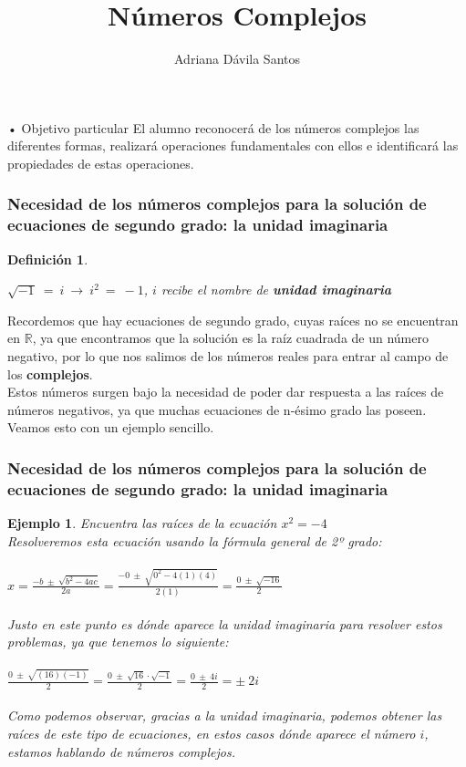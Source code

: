 \documentclass[11pt]{beamer}
\author{Adriana Dávila Santos}
\title{Números Complejos}
\newtheorem{defi}{Definición}
\newtheorem{ejem}{Ejemplo}
\begin{document}
\begin{frame}
\titlepage
\end{frame}


\begin{frame}{• Objetivo particular}
El alumno reconocerá de los números complejos las diferentes formas, realizará operaciones
fundamentales con ellos e identificará las propiedades de estas operaciones.
\end{frame}

\begin{frame}
\frametitle{Necesidad de los números complejos para la solución de ecuaciones de segundo grado: la
 unidad imaginaria}
\begin{defi}
\begin{center}
$\sqrt{-1}~=~i~\rightarrow~i^2~=~-1$, $i$ recibe el nombre de \textbf{unidad imaginaria}
\end{center}
\end{defi} 
Recordemos que hay ecuaciones de segundo grado, cuyas raíces no se encuentran en $\mathbb{R}$, ya que encontramos que la solución es la raíz cuadrada de un número negativo, por lo que nos salimos de los números reales para entrar al campo de los \textbf{complejos}.\\
Estos números surgen bajo la necesidad de poder dar respuesta a las raíces de números negativos, ya que muchas ecuaciones de n-ésimo grado las poseen.\\
Veamos esto con un ejemplo sencillo.
\end{frame}

\begin{frame}
\frametitle{Necesidad de los números complejos para la solución de ecuaciones de segundo grado: la
 unidad imaginaria}
\begin{ejem}
Encuentra las raíces de la ecuación $x^2=-4$\\
Resolveremos esta ecuación usando la fórmula general de 2º grado:\\ \hspace{0cm} \\
$x= \frac{-b~\pm ~\sqrt{b^2-4ac}}{2a} = \frac{-0~\pm ~\sqrt{0^2-4(1)(4)}}{2(1)} = \frac{0~\pm ~\sqrt{-16}}{2}$\\ \hspace{0cm} \\
Justo en este punto es dónde aparece la unidad imaginaria para resolver estos problemas, ya que tenemos lo siguiente:\\ \hspace{0cm} \\
$\frac{0~\pm ~\sqrt{(16) (-1)}}{2} = \frac{0~\pm ~\sqrt{16}\cdot \sqrt{-1}}{2} = \frac{0~\pm ~4i}{2} = \pm ~2i$\\ \hspace{0cm} \\
Como podemos observar, gracias a la unidad imaginaria, podemos obtener las raíces de este tipo de ecuaciones, en estos casos dónde aparece el número $i$, estamos hablando de números complejos.
\end{ejem}
\end{frame}
\end{document}
